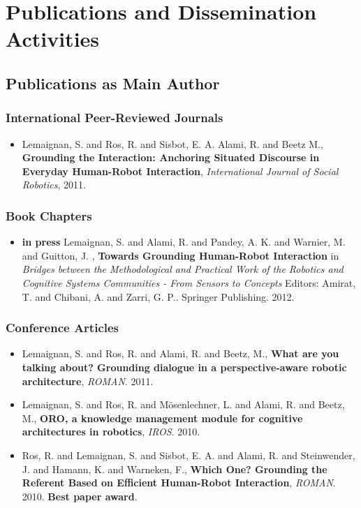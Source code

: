\chapter{Publications and Dissemination Activities}
\label{chapt|publications}

\section{Publications as Main Author}

\subsection {International Peer-Reviewed Journals}

\begin{itemize}
    \item{Lemaignan, S. and Ros, R. and Sisbot, E. A. Alami, R. and Beetz M., \textbf{Grounding the Interaction: Anchoring Situated Discourse in Everyday Human-Robot Interaction}, \textit{International Journal of Social Robotics}, 2011.}
\end{itemize}

\subsection {Book Chapters}

\begin{itemize}
    \item{\textbf{in press} Lemaignan, S. and Alami, R. and Pandey, A. K. and Warnier, M. and Guitton, J. , \textbf{Towards Grounding Human-Robot Interaction} in \textit{Bridges between the Methodological and Practical Work of the Robotics and Cognitive Systems Communities - From Sensors to Concepts} Editors: Amirat, T. and Chibani, A. and Zarri, G. P.. Springer Publishing. 2012.}
\end{itemize}

\subsection {Conference Articles}

\begin{itemize}
    \item{Lemaignan, S. and Ros, R. and Alami, R. and Beetz, M., \textbf{What are you talking about? Grounding dialogue in a perspective-aware robotic architecture}, \textit{ROMAN}. 2011.}
    \item{Lemaignan, S. and Ros, R. and Mösenlechner, L. and Alami, R. and Beetz, M., \textbf{ORO, a knowledge management module for cognitive architectures in robotics}, \textit{IROS}. 2010.}
    \item{Ros, R. and Lemaignan, S. and Sisbot, E. A. and Alami, R. and Steinwender, J. and Hamann, K. and Warneken, F., \textbf{Which One? Grounding the Referent Based on Efficient Human-Robot Interaction}, \textit{ROMAN}. 2010. \textbf{Best paper award}.}
\end{itemize}

